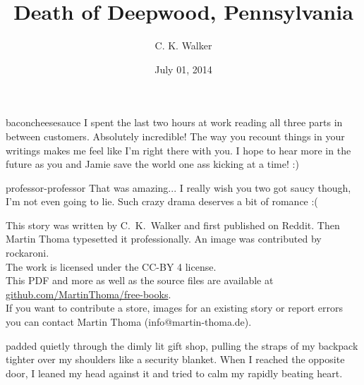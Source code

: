 \documentclass[a5paper]{scrartcl}
\title{Death of Deepwood, Pennsylvania}
\author{C. K. Walker}
\date{July 01, 2014}
\begin{document}
\maketitle

\begin{shadequote}[l]{baconcheesesauce}
I spent the last two hours at work reading all three parts in between customers. Absolutely incredible! The way you recount things in your writings makes me feel like I'm right there with you. I hope to hear more in the future as you and Jamie save the world one ass kicking at a time! :)
\end{shadequote}

\begin{shadequote}[l]{professor-professor}
That was amazing... I really wish you two got saucy though, I'm not even going to lie. Such crazy drama deserves a bit of romance :(
\end{shadequote}


\clearpage

This story was written by C.~K.~Walker and first published on Reddit. Then
Martin Thoma typesetted it professionally. An image was contributed by rockaroni.\\

The work is licensed under the CC-BY 4 license.\\

This PDF and more as well as the source files are available at
\url{github.com/MartinThoma/free-books}.\\

If you want to contribute a store, images for an existing story or report
errors you can contact Martin Thoma (info@martin-thoma.de).

\clearpage



 padded quietly through the dimly lit gift shop, pulling the straps of my backpack tighter over my shoulders like a security blanket. When I reached the opposite door, I leaned my head against it and tried to calm my rapidly beating heart. \\
\end{document}
